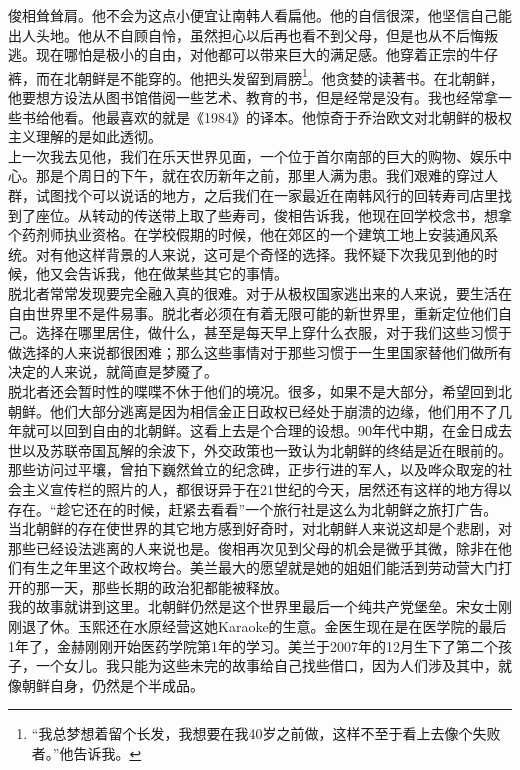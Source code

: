 俊相耸耸肩。他不会为这点小便宜让南韩人看扁他。他的自信很深，他坚信自己能出人头地。他从不自顾自怜，虽然担心以后再也看不到父母，但是也从不后悔叛逃。现在哪怕是极小的自由，对他都可以带来巨大的满足感。他穿着正宗的牛仔裤，而在北朝鲜是不能穿的。他把头发留到肩膀\footnote{“我总梦想着留个长发，我想要在我40岁之前做，这样不至于看上去像个失败者。”他告诉我。}。他贪婪的读著书。在北朝鲜，他要想方设法从图书馆借阅一些艺术、教育的书，但是经常是没有。我也经常拿一些书给他看。他最喜欢的就是《1984》的译本。他惊奇于乔治欧文对北朝鲜的极权主义理解的是如此透彻。\\

上一次我去见他，我们在乐天世界见面，一个位于首尔南部的巨大的购物、娱乐中心。那是个周日的下午，就在农历新年之前，那里人满为患。我们艰难的穿过人群，试图找个可以说话的地方，之后我们在一家最近在南韩风行的回转寿司店里找到了座位。从转动的传送带上取了些寿司，俊相告诉我，他现在回学校念书，想拿个药剂师执业资格。在学校假期的时候，他在郊区的一个建筑工地上安装通风系统。对有他这样背景的人来说，这可是个奇怪的选择。我怀疑下次我见到他的时候，他又会告诉我，他在做某些其它的事情。\\

脱北者常常发现要完全融入真的很难。对于从极权国家逃出来的人来说，要生活在自由世界里不是件易事。脱北者必须在有着无限可能的新世界里，重新定位他们自己。选择在哪里居住，做什么，甚至是每天早上穿什么衣服，对于我们这些习惯于做选择的人来说都很困难；那么这些事情对于那些习惯于一生里国家替他们做所有决定的人来说，就简直是梦魇了。\\

脱北者还会暂时性的喋喋不休于他们的境况。很多，如果不是大部分，希望回到北朝鲜。他们大部分逃离是因为相信金正日政权已经处于崩溃的边缘，他们用不了几年就可以回到自由的北朝鲜。这看上去是个合理的设想。90年代中期，在金日成去世以及苏联帝国瓦解的余波下，外交政策也一致认为北朝鲜的终结是近在眼前的。那些访问过平壤，曾拍下巍然耸立的纪念碑，正步行进的军人，以及哗众取宠的社会主义宣传栏的照片的人，都很讶异于在21世纪的今天，居然还有这样的地方得以存在。“趁它还在的时候，赶紧去看看”一个旅行社是这么为北朝鲜之旅打广告。\\

当北朝鲜的存在使世界的其它地方感到好奇时，对北朝鲜人来说这却是个悲剧，对那些已经设法逃离的人来说也是。俊相再次见到父母的机会是微乎其微，除非在他们有生之年里这个政权垮台。美兰最大的愿望就是她的姐姐们能活到劳动营大门打开的那一天，那些长期的政治犯都能被释放。\\

我的故事就讲到这里。北朝鲜仍然是这个世界里最后一个纯共产党堡垒。宋女士刚刚退了休。玉熙还在水原经营这她Karaoke的生意。金医生现在是在医学院的最后1年了，金赫刚刚开始医药学院第1年的学习。美兰于2007年的12月生下了第二个孩子，一个女儿。我只能为这些未完的故事给自己找些借口，因为人们涉及其中，就像朝鲜自身，仍然是个半成品。\\
